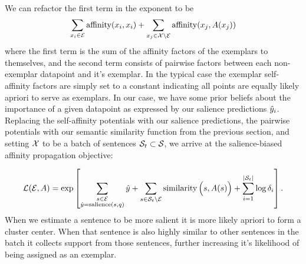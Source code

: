  We can refactor the first term in the exponent to be 
\[ \sum_{x_i \in \mathcal{E}} \operatorname{affinity}(x_i, x_i) +
 \sum_{x_j \in \mathcal{X} \setminus \mathcal{E}} \operatorname{affinity}(x_j, A(x_j))
 \]
where the first term is the sum of the affinity factors of the exemplars 
to themselves,
and the second term consists of  pairwise factors between each non-exemplar 
datapoint 
and it's exemplar. In the typical case the exemplar self-affinity factors are 
simply 
set to a constant indicating all points are equally likely apriori to serve
as exemplars. In our case, we have some prior beliefs about the importance of 
a given datapoint as expressed by our salience predictions $\hat{y}_i$.
Replacing the self-affinity potentials with our salience predictions, 
the pairwise potentials with our semantic similarity function from the 
previous section, and setting $\mathcal{X}$ to be a batch of sentences 
$\mathcal{S}_t \subset \mathcal{S}$,
we arrive at the salience-biased affinity propagation
objective:

 \[ \mathcal{L}(\mathcal{E}, A) = \exp\left[
    \sum_{\substack{s \in \mathcal{E} \\ \hat{y} = \operatorname{salience}(s, q)}} \hat{y}  + \sum_{s \in \mathcal{S}_t \setminus \mathcal{E}} \operatorname{similarity}\Big(s, A(s)\Big)  + \sum_{i=1}^{|\mathcal{S}_t|} \log\delta_i \right].
\] 
When we estimate a sentence to be more salient it is more likely apriori
to form a cluster center. When that sentence is also highly similar to other 
sentences in the batch it collects support from those sentences, further
increasing it's likelihood of being assigned as an exemplar.
 



